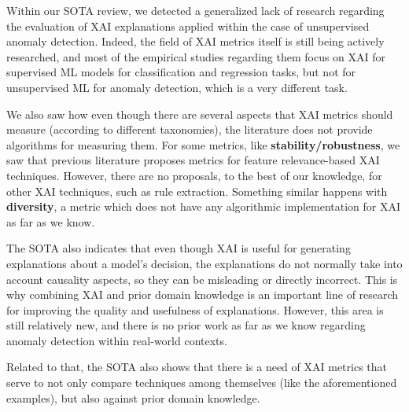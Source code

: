 Within our SOTA review, we detected a generalized lack of research regarding the evaluation of XAI explanations applied within the case of unsupervised anomaly detection. Indeed, the field of XAI metrics itself is still being actively researched, and most of the empirical studies regarding them focus on XAI for supervised ML models for classification and regression tasks, but not for unsupervised ML for anomaly detection, which is a very different task. 

We also saw how even though there are several aspects that XAI metrics should measure (according to different taxonomies), the literature does not provide algorithms for measuring them. For some metrics, like \textbf{stability/robustness}, we saw that previous literature proposes metrics for feature relevance-based XAI techniques. However, there are no proposals, to the best of our knowledge, for other XAI techniques, such as rule extraction. Something similar happens with \textbf{diversity}, a metric which does not have any algorithmic implementation for XAI as far as we know.

The SOTA also indicates that even though XAI is useful for generating explanations about a model's decision, the explanations do not normally take into account causality aspects, so they can be misleading or directly incorrect. This is why combining XAI and prior domain knowledge is an important line of research for improving the quality and usefulness of explanations. However, this area is still relatively new, and there is no prior work as far as we know regarding anomaly detection within real-world contexts.

Related to that, the SOTA also shows that there is a need of XAI metrics that serve to not only compare techniques among themselves (like the aforementioned examples), but also against prior domain knowledge.

\newpage